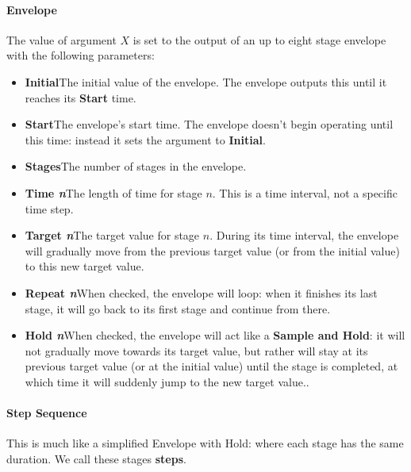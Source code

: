 \documentclass[twoside,10pt]{article}
\begin{document}
\paragraph{Envelope}

The value of argument \(X\) is set to the output of an up to eight stage envelope with the following parameters:

\begin{itemize}
\item {\bf Initial}\qquad The initial value of the envelope.   The envelope outputs this until it reaches its {\bf Start} time.
\item {\bf Start}\qquad The envelope's start time.  The envelope doesn't begin operating until this time: instead it sets the argument to {\bf Initial}.
\item {\bf Stages}\qquad The number of stages in the envelope.
\item {\bf Time \textit{n}}\qquad The length of time for stage \(n\).  This is a time interval, not a specific time step.
\item {\bf Target \textit{n}}\qquad The target value for stage \(n\).  During its time interval, the envelope will gradually move from the previous target value (or from the initial value) to this new target value.
\item {\bf Repeat \textit{n}}\qquad When checked, the envelope will loop: when it finishes its last stage, it will go back to its first stage and continue from there.
\item {\bf Hold \textit{n}}\qquad When checked, the envelope will act like a {\bf Sample and Hold}: it will not gradually move towards its target value, but rather will stay at its previous target value (or at the initial value) until the stage is completed, at which time it will suddenly jump to the new target value..
\end{itemize}

\paragraph{Step Sequence}

This is much like a simplified Envelope with Hold: where each stage has the same duration.   We call these stages {\bf steps}.
\end{document}
